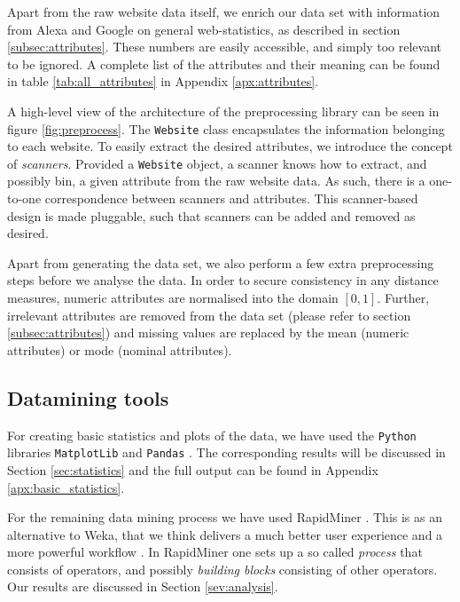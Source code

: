 Apart from the raw website data itself, we enrich our data set with information from Alexa and Google on general web-statistics, as described in section \ref{subsec:attributes}. These numbers are easily accessible, and simply too relevant to be ignored. A complete list of the attributes and their meaning can be found in table \ref{tab:all_attributes} in Appendix \ref{apx:attributes}.

A high-level view of the architecture of the preprocessing library can be seen in figure \ref{fig:preprocess}. The \texttt{Website} class encapsulates the information belonging to each website. To easily extract the desired attributes, we introduce the concept of \textit{scanners}. Provided  a \texttt{Website} object, a scanner knows how to extract, and possibly bin, a given attribute from the raw website data. As such, there is a one-to-one correspondence between scanners and attributes. This scanner-based design is made pluggable, such that scanners can be added and removed as desired.


Apart from generating the data set, we also perform a few extra preprocessing steps before we analyse the data. In order to secure consistency in any distance measures, numeric attributes are normalised into the domain $[0, 1]$. Further, irrelevant attributes are removed from the data set (please refer to section \ref{subsec:attributes}) and missing values are replaced by the mean (numeric attributes) or mode (nominal attributes).

\subsection{Datamining tools}
\label{subsec:weka}

For creating basic statistics and plots of the data, we have used the \texttt{Python} libraries \texttt{MatplotLib} and \texttt{Pandas} \cite{matplotlib, pandas}. The corresponding results will be discussed in Section \ref{sec:statistics} and the full output can be found in Appendix \ref{apx:basic_statistics}.

For the remaining data mining process we have used RapidMiner \cite{rapidminer}. This is as an alternative to Weka, that we think delivers a much better user experience and a more powerful workflow \cite{weka}. In RapidMiner one sets up a so called \textit{process} that consists of operators, and possibly \textit{building blocks} consisting of other operators. Our results are discussed in Section \ref{sev:analysis}.

